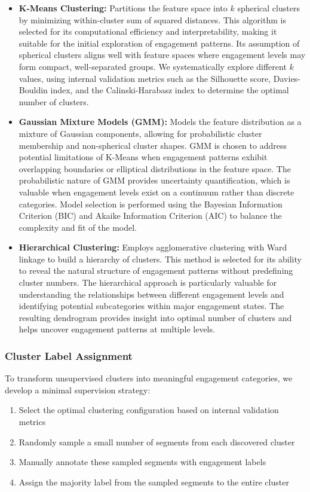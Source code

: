 \documentclass[
]{ceurart}
\begin{document}
\begin{itemize}
    \item \textbf{K-Means Clustering:} Partitions the feature space into $k$ spherical clusters by minimizing within-cluster sum of squared distances. This algorithm is selected for its computational efficiency and interpretability, making it suitable for the initial exploration of engagement patterns. Its assumption of spherical clusters aligns well with feature spaces where engagement levels may form compact, well-separated groups. We systematically explore different $k$ values, using internal validation metrics such as the Silhouette score, Davies-Bouldin index, and the Calinski-Harabasz index to determine the optimal number of clusters.
    
    \item \textbf{Gaussian Mixture Models (GMM):} Models the feature distribution as a mixture of Gaussian components, allowing for probabilistic cluster membership and non-spherical cluster shapes. GMM is chosen to address potential limitations of K-Means when engagement patterns exhibit overlapping boundaries or elliptical distributions in the feature space. The probabilistic nature of GMM provides uncertainty quantification, which is valuable when engagement levels exist on a continuum rather than discrete categories. Model selection is performed using the Bayesian Information Criterion (BIC) and Akaike Information Criterion (AIC) to balance the complexity and fit of the model.
    
    \item \textbf{Hierarchical Clustering:} Employs agglomerative clustering with Ward linkage to build a hierarchy of clusters. This method is selected for its ability to reveal the natural structure of engagement patterns without predefining cluster numbers. The hierarchical approach is particularly valuable for understanding the relationships between different engagement levels and identifying potential subcategories within major engagement states. The resulting dendrogram provides insight into optimal number of clusters and helps uncover engagement patterns at multiple levels.
\end{itemize}

\subsubsection{Cluster Label Assignment}
To transform unsupervised clusters into meaningful engagement categories, we develop a minimal supervision strategy:
\begin{enumerate}
    \item Select the optimal clustering configuration based on internal validation metrics
    \item Randomly sample a small number of segments from each discovered cluster
    \item Manually annotate these sampled segments with engagement labels
    \item Assign the majority label from the sampled segments to the entire cluster
\end{enumerate}
\end{document}
